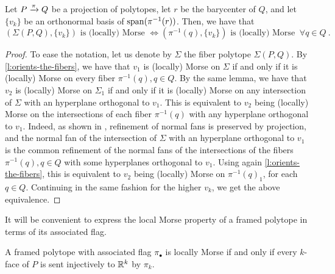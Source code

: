 
\begin{theorem}	
\label{t:bot-top-for-fibers}
	Let $P \xrightarrow{\pi} Q$ be a projection of polytopes, let $r$ be the barycenter of $Q$, and let $\{v_k\}$ be an orthonormal basis of $\operatorname{\mathrm{span}}(\pi^{-1}(r))$.
	Then, we have that
	\[
	(\Sigma(P,Q),\{v_k\}) \text{ is (locally) Morse }
	\iff (\pi^{-1}(q),\{v_k\}) \text{ is (locally) Morse } \ \forall q \in Q \ .
	\]
\end{theorem}

\begin{proof}
	To ease the notation, let us denote by $\Sigma$ the fiber polytope $\Sigma(P,Q)$.
	By \cref{l:orients-the-fibers}, we have that $v_1$ is (locally) Morse on $\Sigma$ if and only if it is (locally) Morse on every fiber $\pi^{-1}(q), q \in Q$.
	By the same lemma, we have that $v_2$ is (locally) Morse on $\Sigma_1$ if and only if it is (locally) Morse on any intersection of $\Sigma$ with an hyperplane orthogonal to $v_1$.
	This is equivalent to $v_2$ being (locally) Morse on the intersections of each fiber $\pi^{-1}(q)$ with any hyperplane orthogonal to $v_1$.
	Indeed, as shown in \cite[Lemma 3.1]{BilleraSturmfels94}, refinement of normal fans is preserved by projection, and the normal fan of the intersection of $\Sigma$ with an hyperplane orthogonal to $v_1$ is the common refinement of the normal fans of the intersections of the fibers $\pi^{-1}(q), q \in Q$ with some hyperplanes orthogonal to $v_1$.
	Using again \cref{l:orients-the-fibers}, this is equivalent to $v_2$ being (locally) Morse on $\pi^{-1}(q)_1$, for each $q \in Q$.
	Continuing in the same fashion for the higher $v_k$, we get the above equivalence.
\end{proof}

It will be convenient to express the local Morse property of a framed polytope in terms of its associated flag.

\begin{theorem}
	A framed polytope with associated flag $\pi_\bullet$ is locally Morse if and only if every $k$-face of $P$ is sent injectively to $\mathbb{R}^k$ by $\pi_k$.
\end{theorem}

